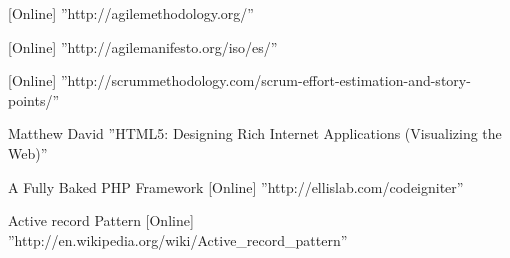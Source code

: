 \begin{thebibliography}{100}
 [Online] ''http://agilemethodology.org/''

 [Online] ''http://agilemanifesto.org/iso/es/''

 [Online] ''http://scrummethodology.com/scrum-effort-estimation-and-story-points/''

 Matthew David ''HTML5: Designing Rich Internet Applications (Visualizing the Web)''

 A Fully Baked PHP Framework [Online] ''http://ellislab.com/codeigniter''

 Active record Pattern [Online] ''http://en.wikipedia.org/wiki/Active_record_pattern''
\end{thebibliography}
